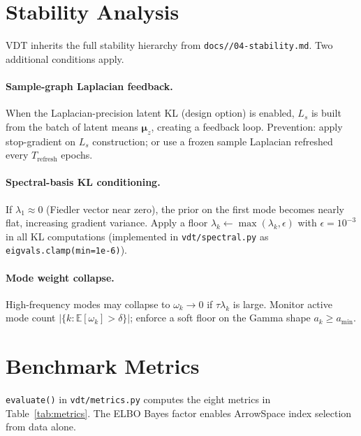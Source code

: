 \documentclass[11pt,a4paper]{article}
\newcommand{\E}{\mathbb{E}}
\newcommand{\bmu}{\bm{\mu}}
\begin{document}
{%
\section{Stability Analysis}
\label{sec:stability}

VDT inherits the full stability hierarchy from
\texttt{docs//04-stability.md}.  Two additional conditions apply.

\paragraph{Sample-graph Laplacian feedback.}
When the Laplacian-precision latent KL (design option) is enabled, $L_s$ is
built from the batch of latent means $\bmu_z$, creating a feedback loop.
Prevention: apply stop-gradient on $L_s$ construction; or use a frozen
sample Laplacian refreshed every $T_{\mathrm{refresh}}$ epochs.

\paragraph{Spectral-basis KL conditioning.}
If $\lambda_1\approx 0$ (Fiedler vector near zero), the prior on the first
mode becomes nearly flat, increasing gradient variance.  Apply a floor
$\lambda_k\leftarrow\max(\lambda_k,\epsilon)$ with $\epsilon=10^{-3}$ in all
KL computations (implemented in \texttt{vdt/spectral.py} as
\texttt{eigvals.clamp(min=1e-6)}).

\paragraph{Mode weight collapse.}
High-frequency modes may collapse to $\omega_k\to 0$ if $\tau\lambda_k$ is
large.  Monitor active mode count $|\{k : \E[\omega_k]>\delta\}|$; enforce a
soft floor on the Gamma shape $a_k\ge a_{\min}$.

\section{Benchmark Metrics}
\label{sec:benchmarks}

\texttt{evaluate()} in \texttt{vdt/metrics.py} computes the eight metrics in
Table~\ref{tab:metrics}.  The ELBO Bayes factor enables ArrowSpace index
selection from data alone.

}
\end{document}
